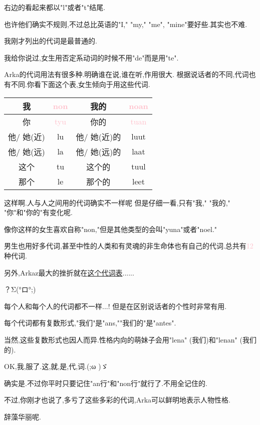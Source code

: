 右边的看起来都以"l"或者"t"结尾.

也许他们确实不规则,不过总比英语的"I," "my," "me", "mine"要好些.其实也不难.


我刚才列出的代词是最普通的.

我给你说过,女生用否定系动词的时候不用"de"而是用"te".

Arka的代词用法有很多种.明确谁在说,谁在听,作用很大.
根据说话者的不同,代词也有不同.你看下面这个表,女生倾向于用这些代词.
\begin{table}[H]
    \begin{tabular}{|c|c|c|c|} %
    \hline
	我&  \textcolor{pink}{non}&  我的&  \textcolor{pink}{noan}\\\hline
	你&  \textcolor{pink}{tyu}&  你的&  \textcolor{pink}{tuan}\\\hline
  	他/ 她(近)&  lu&  他/ 她(近)的&  luut\\\hline
	他/ 她(远)&  la&  他/ 她(远)的&  laat\\\hline
	这个&  tu&  这个的&  tuul\\\hline
	那个&  le&  那个的&  leet\\\hline
	\end{tabular}
\end{table}

这样啊.人与人之间用的代词确实不一样呢
但是仔细一看,只有"我," "我的," "你"和"你的"有变化呢.


像你这样的女生喜欢自称"non,"但是其他类型的会叫"yuna"或者"noel."

男生也用好多代词,甚至中性的人类和有灵魂的非生命体也有自己的代词.总共有\textcolor{pink}{12}种代词.

另外,Arkaz最大的挫折就在\hyperlink{appendix-pronouns}{这个代词表}......


？Σ(°ロ°;)

每个人和每个人的代词都不一样...! 但是在区别说话者的个性时非常有用.


每个代词都有复数形式,"我们"是"ans,""我们的"是"antes".

当然,这些复数形式也因人而异.性格内向的萌妹子会用"lena" (我们)和"lenan" (我们的).


OK,我,服了.这,就,是,代,词.(;\CircleShadow ω \CircleShadow )ゞ


确实是.不过你平时只要记住"an行"和"non行"就行了.不用全记住的.

不过,你刚才也说了,多亏了这些多彩的代词,Arka可以鲜明地表示人物性格.


辞藻华丽呢.




